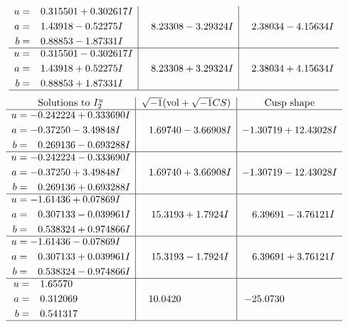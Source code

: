 \documentclass[1p]{elsarticle_modified}
\theoremstyle{definition}
\newcommand{\I}{\sqrt{-1}}
\begin{document}
$$\begin{array}{c|c|c}
\begin{aligned}
u &= \phantom{-}0.315501 + 0.302617 I \\
a &= \phantom{-}1.43918 - 0.52275 I \\
b &= \phantom{-}0.88853 - 1.87331 I\end{aligned}
 & \phantom{-}8.23308 - 3.29324 I & \phantom{-}2.38034 - 4.15634 I \\ \hline\begin{aligned}
u &= \phantom{-}0.315501 - 0.302617 I \\
a &= \phantom{-}1.43918 + 0.52275 I \\
b &= \phantom{-}0.88853 + 1.87331 I\end{aligned}
 & \phantom{-}8.23308 + 3.29324 I & \phantom{-}2.38034 + 4.15634 I\\
 \hline 
 \end{array}$$\newpage$$\begin{array}{c|c|c}  
\text{Solutions to }I^u_{2}& \I (\text{vol} + \sqrt{-1}CS) & \text{Cusp shape}\\
 \hline 
\begin{aligned}
u &= -0.242224 + 0.333690 I \\
a &= -0.37250 - 3.49848 I \\
b &= \phantom{-}0.269136 - 0.693288 I\end{aligned}
 & \phantom{-}1.69740 - 3.66908 I & -1.30719 + 12.43028 I \\ \hline\begin{aligned}
u &= -0.242224 - 0.333690 I \\
a &= -0.37250 + 3.49848 I \\
b &= \phantom{-}0.269136 + 0.693288 I\end{aligned}
 & \phantom{-}1.69740 + 3.66908 I & -1.30719 - 12.43028 I \\ \hline\begin{aligned}
u &= -1.61436 + 0.07869 I \\
a &= \phantom{-}0.307133 - 0.039961 I \\
b &= \phantom{-}0.538324 + 0.974866 I\end{aligned}
 & \phantom{-}15.3193 + 1.7924 I & \phantom{-}6.39691 - 3.76121 I \\ \hline\begin{aligned}
u &= -1.61436 - 0.07869 I \\
a &= \phantom{-}0.307133 + 0.039961 I \\
b &= \phantom{-}0.538324 - 0.974866 I\end{aligned}
 & \phantom{-}15.3193 - 1.7924 I & \phantom{-}6.39691 + 3.76121 I \\ \hline\begin{aligned}
u &= \phantom{-}1.65570\phantom{ +0.000000I} \\
a &= \phantom{-}0.312069\phantom{ +0.000000I} \\
b &= \phantom{-}0.541317\phantom{ +0.000000I}\end{aligned}
 & \phantom{-}10.0420\phantom{ +0.000000I} & -25.0730\phantom{ +0.000000I}\\
 \hline 
 \end{array}$$\newpage\newpage\renewcommand{\arraystretch}{1}
\end{document}
